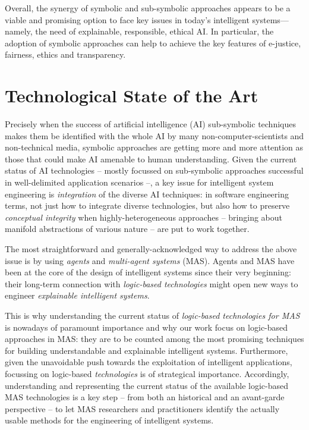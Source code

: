 \documentclass[12pt,a4paper,openright,twoside]{book}
\begin{document}
Overall, the synergy of symbolic and sub-symbolic approaches appears to be a viable and promising option to face key issues in today's intelligent systems---namely, the need of explainable, responsible, ethical AI.
%
In particular, the adoption of symbolic approaches can help to achieve the key features of e-justice, fairness, ethics and transparency.


\chapter{Technological State of the Art}


Precisely when the success of artificial intelligence (AI) sub-symbolic techniques makes them be identified with the whole AI by many non-computer-scientists and non-technical media, symbolic approaches are getting more and more attention as those that could make AI amenable to human understanding.
%
Given the current status of AI technologies -- mostly focussed on sub-symbolic approaches successful in well-delimited application scenarios --, a key issue for intelligent system engineering is \emph{integration} of the diverse AI techniques: in software engineering terms, not just how to integrate diverse technologies, but also how to preserve \emph{conceptual integrity} when highly-heterogeneous approaches -- bringing about manifold abstractions of various nature -- are put to work together.

The most straightforward and generally-acknowledged way to address the above issue is by using \emph{agents} and \emph{multi-agent systems} (MAS).
%
Agents and MAS have been at the core of the design of intelligent systems since their very beginning:  their long-term connection with \emph{logic-based technologies} might open new ways to engineer \emph{explainable intelligent systems}.

This is why understanding the current status of \emph{logic-based technologies for MAS} is nowadays of paramount importance and why our work focus on logic-based approaches in MAS: they are to be counted among the most promising techniques for building understandable and explainable intelligent systems.
%
Furthermore, given the unavoidable push towards the exploitation of intelligent applications, focussing on logic-based \emph{technologies} is of strategical importance.
%
Accordingly, understanding and representing the current status of the available logic-based MAS technologies is a key step -- from both an historical and an avant-garde perspective -- to let MAS researchers and practitioners identify the actually usable methods for the engineering of intelligent systems.
\end{document}
